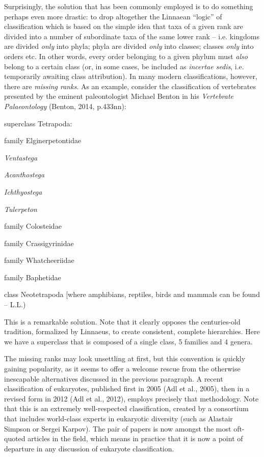 \documentclass[a4paper]{article}
\begin{document}
Surprisingly, the solution that has been commonly employed is to do something perhaps even more drastic: to drop
altogether the Linnaean “logic” of classification which is based on the simple idea that taxa of a given rank are
divided into a number of subordinate taxa of the same lower rank – i.e. kingdoms are divided \textit{only} into phyla;
phyla are divided \textit{only} into classes; classes \textit{only} into orders etc. In other words, every order
belonging to a given phylum must \textit{also }belong to a certain class (or, in some cases, be included as
\textit{incertae sedis}, i.e. temporarily awaiting class attribution). In many modern classifications, however, there
are \textit{missing ranks}. As an example, consider the classification of vertebrates presented by the eminent
paleontologist Michael Benton in his \textit{Vertebrate Palaeontology} \label{ref:RNDqnkTfPlTq8}(Benton, 2014,
p.433nn):

 superclass Tetrapoda:

 {\BigCircle} family Elginerpetontidae

 {\BigCircle} \textit{Ventastega}

 {\BigCircle} \textit{Acanthostega}

 {\BigCircle} \textit{Ichthyostega}

 {\BigCircle} \textit{Tulerpeton}

 {\BigCircle} family Colosteidae

 {\BigCircle} family Crassigyrinidae

 {\BigCircle} family Whatcheeriidae

 {\BigCircle} family Baphetidae

 {\BigCircle} class Neotetrapoda [where amphibians, reptiles, birds and mammals can be found – L.L.)

This is a remarkable solution. Note that it clearly opposes the centuries-old tradition, formalized by Linnaeus, to
create consistent, complete hierarchies. Here we have a superclass that is composed of a single class, 5 families and 4
genera.

The missing ranks may look unsettling at first, but this convention is quickly gaining popularity, as it seems to offer
a welcome rescue from the otherwise inescapable alternatives discussed in the previous paragraph. A recent
classification of eukaryotes, published first in 2005 \label{ref:RND5C0kzbt9Jm}(Adl et al., 2005), then in a revised
form in 2012 \label{ref:RND2nC4dhq2C7}(Adl et al., 2012), employs precisely that methodology. Note that this is an
extremely well-respected classification, created by a consortium that includes world-class experts in eukaryotic
diversity (such as Alastair Simpson or Sergei Karpov). The pair of papers is now amongst the most oft-quoted articles
in the field, which means in practice that it is now a point of departure in any discussion of eukaryote
classification.
\end{document}
